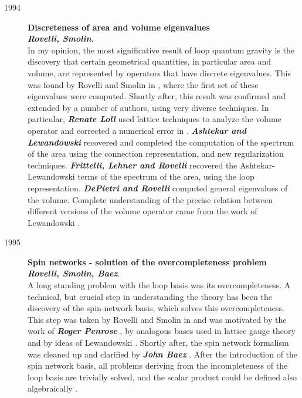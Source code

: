 \documentclass[12pt]{article}
\begin{document}
\begin{description}
	\item[1994] {\bf Discreteness of area and volume eigenvalues\\
	{\em Rovelli, Smolin}}.\\
	In my opinion, the most significative result of loop quantum 
	gravity is the discovery that certain geometrical quantities, 
	in particular area and volume, are represented by operators 
	that have discrete eigenvalues.  This was found by Rovelli 
	and Smolin in \cite{RovelliSmolin95}, where the first set of 
	these eigenvalues were computed.   Shortly after, this result 
	was confirmed and extended by a number of authors, using very 
	diverse techniques.  In particular, \textbf{\em Renate Loll} 
	\cite{Loll95b,Loll95bb} used lattice techniques to analyze 
	the volume operator and corrected a numerical error in 
	\cite{RovelliSmolin95}.  \textbf{\em Ashtekar and 
	Lewandowski} \cite{LewandowskiArea,AshtekarLewandowskiArea2} 
	recovered and completed the computation of the spectrum of 
	the area using the connection representation, and new 
	regularization techniques.  \textbf{\em 
	Frittelli, Lehner and Rovelli} \cite{FrittelliEtAl} recovered 
	the Ashtekar-Lewandowski terms of the spectrum of the area, 
	using the loop representation.  \textbf{\em DePietri and 
	Rovelli\/} \cite{DePietriRovelli} computed general 
	eigenvalues of the volume.  Complete understanding of the 
	precise relation between different versions of the volume 
	operator came from the work of Lewandowski 
	\cite{Lewandowski97}.

	\item[1995] {\bf  Spin networks - solution of the overcompleteness 
	problem\\
	{\em Rovelli, Smolin, Baez}}.\\
	A long standing problem with the loop basis was its 
	overcompleteness.  A technical, but crucial step in understanding 
	the theory has been the discovery of the spin-network basis, which 
	solves this overcompleteness.  This step was taken by Rovelli and 
	Smolin in \cite{RovelliSmolin95b} and was motivated by the work of 
	\textbf{\em Roger Penrose} \cite{Penrose,Penrose2}, by analogous 
	bases used in lattice gauge theory and by ideas of Lewandowski 
	\cite{JerzyGraph}.  Shortly after, the spin network formalism was 
	cleaned up and clarified by \textbf{\em John Baez} 
	\cite{Baez95a,Baez95aa}.  After the introduction of the spin 
	network basis, all problems deriving from the incompleteness of 
	the loop basis are trivially solved, and the scalar product could 
	be defined also algebraically \cite{DePietriRovelli}.
	

\end{description}
\end{document}
